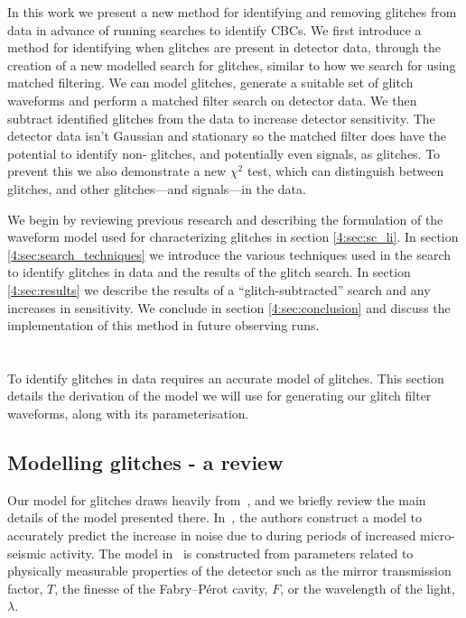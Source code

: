 In this work we present a new method for identifying and removing \scl{} glitches from \gw{} data in advance of running searches to identify CBCs.
We first introduce a method for identifying when \scl{} glitches are present in detector data, through the creation of a new modelled search for \scl{} glitches, similar to how we search for \gws{} using matched filtering. We can model \scl{} glitches, generate a suitable set of glitch waveforms and perform a matched filter search on detector data. We then subtract identified glitches from the data to increase detector sensitivity. The detector data isn't Gaussian and stationary so the matched filter does have the potential to identify non-\scl{} glitches, and potentially even \gw{} signals, as \scl{} glitches. To prevent this we also demonstrate a new \scl{} $\chi^{2}$ test, which can distinguish between \scl{} glitches, and other glitches---and \gw{} signals---in the data.

We begin by reviewing previous research and describing the formulation of the waveform model used for characterizing \scl{} glitches in section \ref{4:sec:sc_li}. In section \ref{4:sec:search_techniques} we introduce the various techniques used in the search to identify \scl{} glitches in \gw{} data and the results of the \scl{} glitch search. In section \ref{4:sec:results} we describe the results of a ``glitch-subtracted'' \gw{} search and any increases in sensitivity. We conclude in section \ref{4:sec:conclusion} and discuss the implementation of this method in future observing runs.

\section{\label{4:sec:sc_li}\Scl{}}

To identify \scl{} glitches in \gw{} data requires an accurate model of \scl{} glitches. This section details the derivation of the model we will use for generating our \scl{} glitch filter waveforms, along with its parameterisation.

\subsection{Modelling \scl{} glitches - a review}

Our model for \scl{} glitches draws heavily from~\cite{TAccadia:2010}, and we briefly review the main details of the model presented there. In~\cite{TAccadia:2010}, the authors construct a model to accurately predict the increase in noise due to \scl{} during periods of increased micro-seismic activity. The model in~\cite{TAccadia:2010} is constructed from parameters related to physically measurable properties of the detector such as the mirror transmission factor, $T$, the finesse of the Fabry–Pérot cavity, $F$, or the wavelength of the light, $\lambda$.

